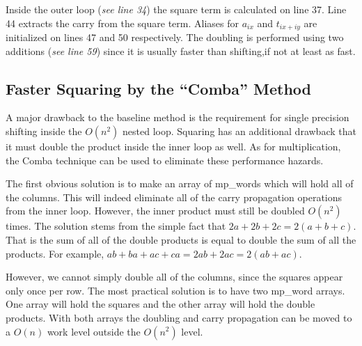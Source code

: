 \documentclass[b5paper]{book}
\begin{document}
Inside the outer loop (\textit{see line 34}) the square term is calculated on line 37.  Line 44 extracts the carry from the square
term.  Aliases for $a_{ix}$ and $t_{ix+iy}$ are initialized on lines 47 and 50 respectively.  The doubling is performed using two
additions (\textit{see line 59}) since it is usually faster than shifting,if not at least as fast.  

\subsection{Faster Squaring by the ``Comba'' Method}
A major drawback to the baseline method is the requirement for single precision shifting inside the $O(n^2)$ nested loop.  Squaring has an additional
drawback that it must double the product inside the inner loop as well.  As for multiplication, the Comba technique can be used to eliminate these
performance hazards.

The first obvious solution is to make an array of mp\_words which will hold all of the columns.  This will indeed eliminate all of the carry
propagation operations from the inner loop.  However, the inner product must still be doubled $O(n^2)$ times.  The solution stems from the simple fact
that $2a + 2b + 2c = 2(a + b + c)$.  That is the sum of all of the double products is equal to double the sum of all the products.  For example,
$ab + ba + ac + ca = 2ab + 2ac = 2(ab + ac)$.  

However, we cannot simply double all of the columns, since the squares appear only once per row.  The most practical solution is to have two mp\_word
arrays.  One array will hold the squares and the other array will hold the double products.  With both arrays the doubling and carry propagation can be 
moved to a $O(n)$ work level outside the $O(n^2)$ level.  
\end{document}

